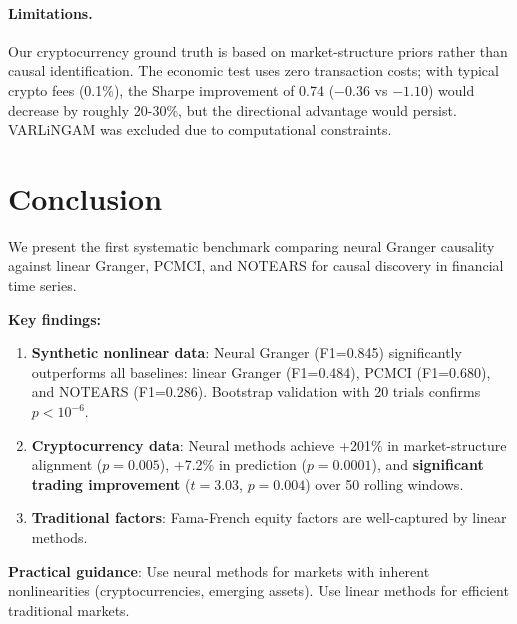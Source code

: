 \documentclass[sigconf,nonacm]{acmart}
\begin{document}
\paragraph{Limitations.}
Our cryptocurrency ground truth is based on market-structure priors rather than causal identification. The economic test uses zero transaction costs; with typical crypto fees (0.1\%), the Sharpe improvement of 0.74 ($-0.36$ vs $-1.10$) would decrease by roughly 20-30\%, but the directional advantage would persist. VARLiNGAM was excluded due to computational constraints.

\section{Conclusion}

We present the first systematic benchmark comparing neural Granger causality against linear Granger, PCMCI, and NOTEARS for causal discovery in financial time series.

\textbf{Key findings:}
\begin{enumerate}
    \item \textbf{Synthetic nonlinear data}: Neural Granger (F1=0.845) significantly outperforms all baselines: linear Granger (F1=0.484), PCMCI (F1=0.680), and NOTEARS (F1=0.286). Bootstrap validation with 20 trials confirms $p < 10^{-6}$.

    \item \textbf{Cryptocurrency data}: Neural methods achieve +201\% in market-structure alignment ($p=0.005$), +7.2\% in prediction ($p=0.0001$), and \textbf{significant trading improvement} ($t=3.03$, $p=0.004$) over 50 rolling windows.

    \item \textbf{Traditional factors}: Fama-French equity factors are well-captured by linear methods.
\end{enumerate}

\textbf{Practical guidance}: Use neural methods for markets with inherent nonlinearities (cryptocurrencies, emerging assets). Use linear methods for efficient traditional markets.



\end{document}
